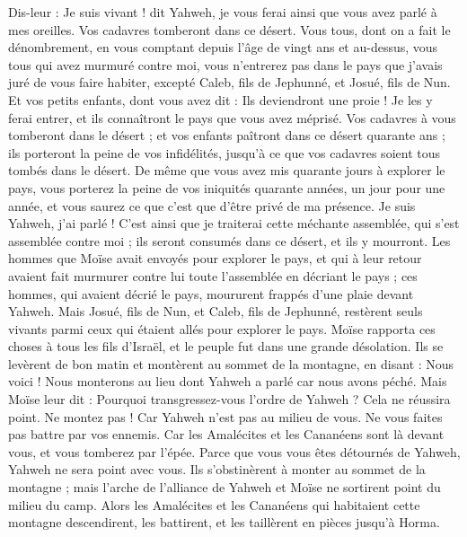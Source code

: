 \begin{multicols}{2}
Dis-leur : Je suis vivant ! dit Yahweh, je vous ferai ainsi que vous avez parlé à mes oreilles.
Vos cadavres tomberont dans ce désert. Vous tous, dont on a fait le dénombrement, en vous comptant depuis l'âge de vingt ans et au-dessus, vous tous qui avez murmuré contre moi,
vous n'entrerez pas dans le pays que j'avais juré de vous faire habiter, excepté Caleb, fils de Jephunné, et Josué, fils de Nun.
Et vos petits enfants, dont vous avez dit : Ils deviendront une proie ! Je les y ferai entrer, et ils connaîtront le pays que vous avez méprisé.
Vos cadavres à vous tomberont dans le désert ;
et vos enfants paîtront dans ce désert quarante ans ; ils porteront la peine de vos infidélités, jusqu'à ce que vos cadavres soient tous tombés dans le désert.
De même que vous avez mis quarante jours à explorer le pays, vous porterez la peine de vos iniquités quarante années, un jour pour une année, et vous saurez ce que c'est que d'être privé de ma présence.
Je suis Yahweh, j'ai parlé ! C'est ainsi que je traiterai cette méchante assemblée, qui s'est assemblée contre moi ; ils seront consumés dans ce désert, et ils y mourront.
Les hommes que Moïse avait envoyés pour explorer le pays, et qui à leur retour avaient fait murmurer contre lui toute l'assemblée en décriant le pays ;
ces hommes, qui avaient décrié le pays, moururent frappés d'une plaie devant Yahweh.
Mais Josué, fils de Nun, et Caleb, fils de Jephunné, restèrent seuls vivants parmi ceux qui étaient allés pour explorer le pays.
Moïse rapporta ces choses à tous les fils d'Israël, et le peuple fut dans une grande désolation.
Ils se levèrent de bon matin et montèrent au sommet de la montagne, en disant : Nous voici ! Nous monterons au lieu dont Yahweh a parlé car nous avons péché.
Mais Moïse leur dit : Pourquoi transgressez-vous l'ordre de Yahweh ? Cela ne réussira point.
Ne montez pas ! Car Yahweh n'est pas au milieu de vous. Ne vous faites pas battre par vos ennemis.
Car les Amalécites et les Cananéens sont là devant vous, et vous tomberez par l'épée. Parce que vous vous êtes détournés de Yahweh, Yahweh ne sera point avec vous.
Ils s'obstinèrent à monter au sommet de la montagne ; mais l'arche de l'alliance de Yahweh et Moïse ne sortirent point du milieu du camp.
Alors les Amalécites et les Cananéens qui habitaient cette montagne descendirent, les battirent, et les taillèrent en pièces jusqu'à Horma.

\end{multicols}
